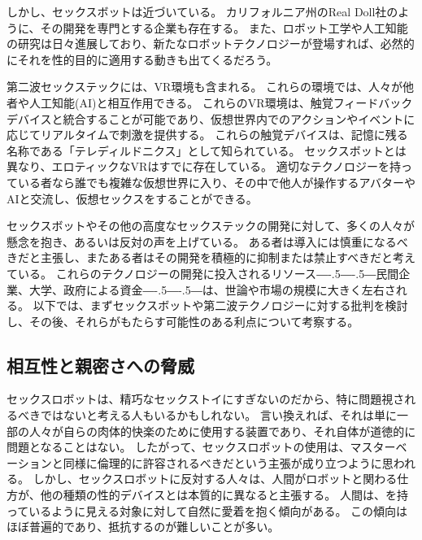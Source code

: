 \documentclass[paper=a4,book,openany]{jlreq}
\def\DDASH{―\kern-.5\zw―\kern-.5\zw―}
\begin{document}
しかし、セックスボットは近づいている。
カリフォルニア州のReal Doll社のように、その開発を専門とする企業も存在する。
また、ロボット工学や人工知能の研究は日々進展しており、新たなロボットテクノロジーが登場すれば、必然的にそれを性的目的に適用する動きも出てくるだろう。

第二波セックステックには、VR環境も含まれる。
これらの環境では、人々が他者や人工知能(AI)と相互作用できる。
これらのVR環境は、触覚フィードバックデバイスと統合することが可能であり、仮想世界内でのアクションやイベントに応じてリアルタイムで刺激を提供する。
これらの触覚デバイスは、記憶に残る名称である「テレディルドニクス」として知られている。
セックスボットとは異なり、エロティックなVRはすでに存在している。
適切なテクノロジーを持っている者なら誰でも複雑な仮想世界に入り、その中で他人が操作するアバターやAIと交流し、仮想セックスをすることができる。

セックスボットやその他の高度なセックステックの開発に対して、多くの人々が懸念を抱き、あるいは反対の声を上げている。
ある者は導入には慎重になるべきだと主張し、またある者はその開発を積極的に抑制または禁止すべきだと考えている。
これらのテクノロジーの開発に投入されるリソース{\DDASH}民間企業、大学、政府による資金{\DDASH}は、世論や市場の規模に大きく左右される。
以下では、まずセックスボットや第二波テクノロジーに対する批判を検討し、その後、それらがもたらす可能性のある利点について考察する。

\subsection{相互性と親密さへの脅威}

セックスロボットは、精巧なセックストイにすぎないのだから、特に問題視されるべきではないと考える人もいるかもしれない。
言い換えれば、それは単に一部の人々が自らの肉体的快楽のために使用する装置であり、それ自体が道徳的に問題となることはない。
したがって、セックスロボットの使用は、マスターベーションと同様に倫理的に許容されるべきだという主張が成り立つように思われる。
しかし、セックスロボットに反対する人々は、人間がロボットと関わる仕方が、他の種類の性的デバイスとは本質的に異なると主張する。
人間は、を持っているように見える対象に対して自然に愛着を抱く傾向がある。
この傾向はほぼ普遍的であり、抵抗するのが難しいことが多い。
\end{document}
